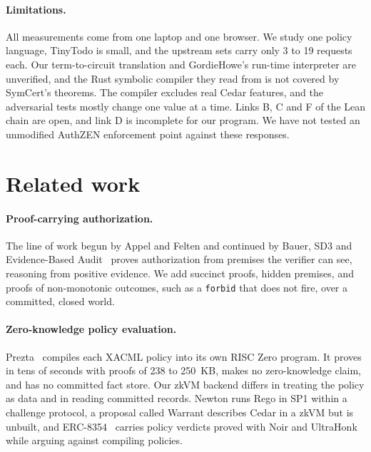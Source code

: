 \documentclass[11pt]{article}
\begin{document}
\paragraph{Limitations.} All measurements come from one laptop and one browser. We study one policy language, TinyTodo is small, and the upstream sets carry only 3 to 19 requests each. Our term-to-circuit translation and GordieHowe's run-time interpreter are unverified, and the Rust symbolic compiler they read from is not covered by SymCert's theorems. The compiler excludes real Cedar features, and the adversarial tests mostly change one value at a time. Links B, C and F of the Lean chain are open, and link D is incomplete for our program. We have not tested an unmodified AuthZEN enforcement point against these responses.


\section{Related work}
\label{sec:related}


\paragraph{Proof-carrying authorization.} The line of work begun by Appel and Felten and continued by Bauer, SD3 and Evidence-Based Audit~\citep{appel1999pca,bauer2001pca,jim2001sd3,vaughan2008evidence} proves authorization from premises the verifier can see, reasoning from positive evidence. We add succinct proofs, hidden premises, and proofs of non-monotonic outcomes, such as a \texttt{forbid} that does not fire, over a committed, closed world.

\paragraph{Zero-knowledge policy evaluation.} Prezta~\citep{wei2026prezta} compiles each XACML policy into its own RISC Zero program. It proves in tens of seconds with proofs of 238 to 250~KB, makes no zero-knowledge claim, and has no committed fact store. Our zkVM backend differs in treating the policy as data and in reading committed records. Newton runs Rego in SP1 within a challenge protocol, a proposal called Warrant describes Cedar in a zkVM but is unbuilt, and ERC-8354~\citep{erc8354} carries policy verdicts proved with Noir and UltraHonk while arguing against compiling policies.
\end{document}

